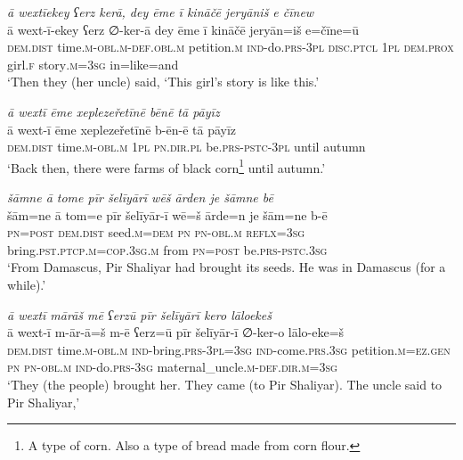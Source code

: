 \ea \label{ZP.88}
\textit{ā wextīekey ʕerz kerā, dey ēme ī kināčē jeryāniš e čīnew} \\ 
\gll ā wext-ī-ekey ʕerz ∅-ker-ā dey ēme ī kināčē jeryān=iš e=čīne=ū \\ 
 \textsc{dem.dist} time\textsc{.m}\textsc{-obl}\textsc{.m}\textsc{-def}\textsc{.obl}\textsc{.m} petition\textsc{.m} \textsc{ind-}do\textsc{.prs}\textsc{-3pl} \textsc{disc.ptcl} \textsc{1pl} \textsc{dem.prox} girl\textsc{.f} story\textsc{.m}\textsc{=3sg} in=like=and \\ 
\glt `Then they (her uncle) said, ‘This girl’s story is like this.'
\z 
 
\ea \label{ZP.94}
\textit{ā wextī ēme xeplezeřetīnē bēnē tā pāyīz} \\ 
\gll ā wext-ī ēme xeplezeřetīnē b-ēn-ē tā pāyīz \\ 
 \textsc{dem.dist} time\textsc{.m}\textsc{-obl}\textsc{.m} \textsc{1pl} \textsc{pn}\textsc{.dir}\textsc{.pl} be\textsc{.prs}\textsc{-pstc}\textsc{-3pl} until autumn \\ 
\glt `Back then, there were farms of black corn\footnote{A type of corn. Also a type of bread made from corn flour.} until autumn.'
\z 
 
\ea \label{ZP.95}
\textit{šāmne ā tome pīr šelīyārī wēš ārden je šāmne bē} \\ 
\gll šām=ne ā tom=e pīr šelīyār-ī wē=š ārde=n je šām=ne b-ē \\ 
 \textsc{pn}\textsc{=\textsc{post}} \textsc{dem.dist} seed\textsc{.m}\textsc{=dem} \textsc{pn} \textsc{pn}\textsc{-obl}\textsc{.m} \textsc{reflx}\textsc{=3sg} bring\textsc{.pst}\textsc{.ptcp}\textsc{.m}\textsc{=cop}\textsc{.3sg}\textsc{.m} from \textsc{pn}\textsc{=\textsc{post}} be\textsc{.prs}\textsc{-pstc}\textsc{.3sg} \\ 
\glt `From Damascus, Pir Shaliyar had brought its seeds. He was in Damascus (for a while).'
\z 
 
\ea \label{ZP.97}
\textit{ā wextī mārāš mē ʕerzū pīr šelīyārī kero lāloekeš} \\ 
\gll ā wext-ī m-ār-ā=š m-ē ʕerz=ū pīr šelīyār-ī ∅-ker-o lālo-eke=š \\ 
 \textsc{dem.dist} time\textsc{.m}\textsc{-obl}\textsc{.m} \textsc{ind-}bring\textsc{.prs}\textsc{-3pl}\textsc{=3sg} \textsc{ind-}come\textsc{.prs}\textsc{.3sg} petition\textsc{.m}\textsc{\textsc{=ez.gen}} \textsc{pn} \textsc{pn}\textsc{-obl}\textsc{.m} \textsc{ind-}do\textsc{.prs}\textsc{-3sg} maternal\_uncle\textsc{.m}\textsc{-def}\textsc{.dir}\textsc{.m}\textsc{=3sg} \\ 
\glt `They (the people) brought her. They came (to Pir Shaliyar). The uncle said to Pir Shaliyar,'
\z 
 
